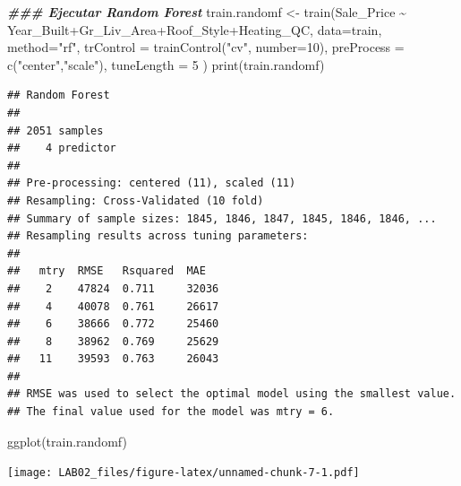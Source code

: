 \documentclass[
]{article}
\newenvironment{Shaded}{\begin{snugshade}}{\end{snugshade}}
\newcommand{\AttributeTok}[1]{\textcolor[rgb]{0.77,0.63,0.00}{#1}}
\newcommand{\DecValTok}[1]{\textcolor[rgb]{0.00,0.00,0.81}{#1}}
\newcommand{\DocumentationTok}[1]{\textcolor[rgb]{0.56,0.35,0.01}{\textbf{\textit{#1}}}}
\newcommand{\FunctionTok}[1]{\textcolor[rgb]{0.00,0.00,0.00}{#1}}
\newcommand{\NormalTok}[1]{#1}
\newcommand{\OtherTok}[1]{\textcolor[rgb]{0.56,0.35,0.01}{#1}}
\newcommand{\SpecialCharTok}[1]{\textcolor[rgb]{0.00,0.00,0.00}{#1}}
\newcommand{\StringTok}[1]{\textcolor[rgb]{0.31,0.60,0.02}{#1}}
\begin{document}
\begin{Shaded}
\begin{Highlighting}[]
\DocumentationTok{\#\#\# Ejecutar Random Forest}
\NormalTok{train.randomf }\OtherTok{\textless{}{-}} \FunctionTok{train}\NormalTok{(Sale\_Price }\SpecialCharTok{\textasciitilde{}}\NormalTok{ Year\_Built}\SpecialCharTok{+}\NormalTok{Gr\_Liv\_Area}\SpecialCharTok{+}\NormalTok{Roof\_Style}\SpecialCharTok{+}\NormalTok{Heating\_QC, }
                       \AttributeTok{data=}\NormalTok{train, }\AttributeTok{method=}\StringTok{"rf"}\NormalTok{,  }
                       \AttributeTok{trControl =} \FunctionTok{trainControl}\NormalTok{(}\StringTok{"cv"}\NormalTok{, }\AttributeTok{number=}\DecValTok{10}\NormalTok{),}
                       \AttributeTok{preProcess =} \FunctionTok{c}\NormalTok{(}\StringTok{"center"}\NormalTok{,}\StringTok{"scale"}\NormalTok{),}
                       \AttributeTok{tuneLength =} \DecValTok{5} 
\NormalTok{)}
\FunctionTok{print}\NormalTok{(train.randomf)}
\end{Highlighting}
\end{Shaded}

\begin{verbatim}
## Random Forest 
## 
## 2051 samples
##    4 predictor
## 
## Pre-processing: centered (11), scaled (11) 
## Resampling: Cross-Validated (10 fold) 
## Summary of sample sizes: 1845, 1846, 1847, 1845, 1846, 1846, ... 
## Resampling results across tuning parameters:
## 
##   mtry  RMSE   Rsquared  MAE  
##    2    47824  0.711     32036
##    4    40078  0.761     26617
##    6    38666  0.772     25460
##    8    38962  0.769     25629
##   11    39593  0.763     26043
## 
## RMSE was used to select the optimal model using the smallest value.
## The final value used for the model was mtry = 6.
\end{verbatim}

\begin{Shaded}
\begin{Highlighting}[]
\FunctionTok{ggplot}\NormalTok{(train.randomf)}
\end{Highlighting}
\end{Shaded}

\texttt{[image: LAB02\_files/figure-latex/unnamed-chunk-7-1.pdf]}

\begin{Shaded}
\end{Shaded}
\end{document}
